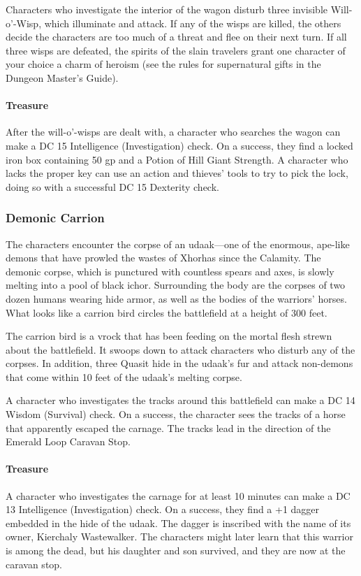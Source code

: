 \documentclass[10pt,a4paper,twoside,bg=print,twocolumn,openany,nodeprecatedcode]{dndbook}
\begin{document}
Characters who investigate the interior of the wagon disturb three invisible Will-o'-Wisp, which illuminate and attack. If any of the wisps are killed, the others decide the characters are too much of a threat and flee on their next turn. If all three wisps are defeated, the spirits of the slain travelers grant one character of your choice a charm of heroism (see the rules for supernatural gifts in the Dungeon Master's Guide).

\paragraph{Treasure}
After the will-o'-wisps are dealt with, a character who searches the wagon can make a DC 15 Intelligence (Investigation) check. On a success, they find a locked iron box containing 50 gp and a Potion of Hill Giant Strength. A character who lacks the proper key can use an action and thieves' tools to try to pick the lock, doing so with a successful DC 15 Dexterity check.



\subsubsection{Demonic Carrion}
The characters encounter the corpse of an udaak—one of the enormous, ape-like demons that have prowled the wastes of Xhorhas since the Calamity. The demonic corpse, which is punctured with countless spears and axes, is slowly melting into a pool of black ichor. Surrounding the body are the corpses of two dozen humans wearing hide armor, as well as the bodies of the warriors' horses. What looks like a carrion bird circles the battlefield at a height of 300 feet.

The carrion bird is a vrock that has been feeding on the mortal flesh strewn about the battlefield. It swoops down to attack characters who disturb any of the corpses. In addition, three Quasit hide in the udaak's fur and attack non-demons that come within 10 feet of the udaak's melting corpse.

A character who investigates the tracks around this battlefield can make a DC 14 Wisdom (Survival) check. On a success, the character sees the tracks of a horse that apparently escaped the carnage. The tracks lead in the direction of the Emerald Loop Caravan Stop.

\paragraph{Treasure}
A character who investigates the carnage for at least 10 minutes can make a DC 13 Intelligence (Investigation) check. On a success, they find a +1 dagger embedded in the hide of the udaak. The dagger is inscribed with the name of its owner, Kierchaly Wastewalker. The characters might later learn that this warrior is among the dead, but his daughter and son survived, and they are now at the caravan stop.
\end{document}
